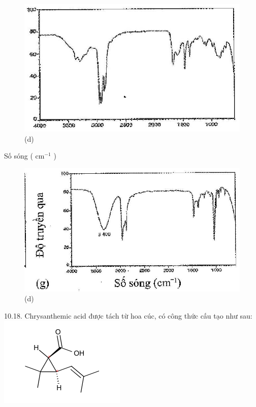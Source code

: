\documentclass[10pt]{article}
\begin{document}
\begin{figure}[h]
\begin{center}
\captionsetup{labelformat=empty}
\caption{(d)}
  \includegraphics[width=\textwidth]{2025_10_23_fa9073eecee116ad8cf2g-38(1)}
\end{center}
\end{figure}

Số sóng ( $\mathrm{cm}^{-1}$ )

\begin{figure}[h]
\begin{center}
\captionsetup{labelformat=empty}
\caption{(d)}
  \includegraphics[width=\textwidth]{2025_10_23_fa9073eecee116ad8cf2g-38(3)}
\end{center}
\end{figure}

10.18. Chrysanthemic acid được tách từ hoa cúc, có công thức cấu tạo như sau:\\
\includegraphics{smile-37b15d4293720f120e01dca31993c162972ee9a6}
\end{document}
